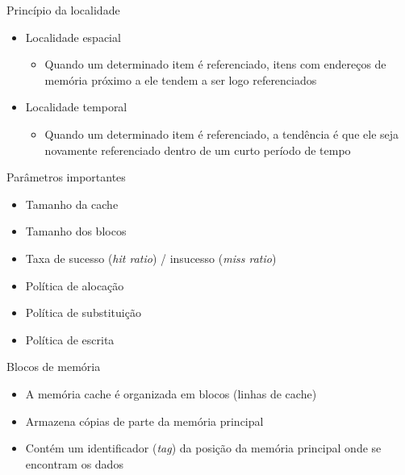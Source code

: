 \documentclass[aspectratio=169,
				xcolor=table]{beamer}
\begin{document}
	\begin{frame}{Princípio da localidade}
		\begin{itemize}
			\item Localidade espacial
			\begin{itemize}
				\item Quando um determinado item é referenciado, itens com endereços de memória próximo a ele tendem a ser logo referenciados
			\end{itemize}
			\vspace{1em}
			\item Localidade temporal
			\begin{itemize}
				\item Quando um determinado item é referenciado, a tendência é que ele seja novamente referenciado dentro de um curto período de tempo
			\end{itemize}
		\end{itemize}
	\end{frame}

	\begin{frame}{Parâmetros importantes}
		\begin{itemize}
			\item Tamanho da cache
			\item Tamanho dos blocos
			\item Taxa de sucesso (\textit{hit ratio}) / insucesso (\textit{miss ratio})
			\item Política de alocação
			\item Política de substituição
			\item Política de escrita
		\end{itemize}
	\end{frame}
	
	\begin{frame}{Blocos de memória}
		\begin{itemize}
			\item A memória cache é organizada em blocos (linhas de cache)
			\vspace{1em}
			\item Armazena cópias de parte da memória principal
			\vspace{1em}
			\item Contém um identificador (\textit{tag}) da posição da memória principal onde se encontram os dados
		\end{itemize}
	\end{frame}	
\end{document}
